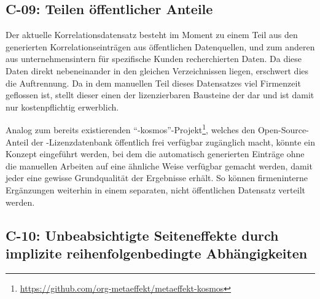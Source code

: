 \subsection{C-09: Teilen öffentlicher Anteile}\label{subsec:c-09-sharing-of-public-data}


Der aktuelle Korrelationsdatensatz besteht im Moment zu einem Teil aus den generierten Korrelationseinträgen aus öffentlichen Datenquellen, und zum anderen aus unternehmensintern für spezifische Kunden recherchierten Daten.
Da diese Daten direkt nebeneinander in den gleichen Verzeichnissen liegen, erschwert dies die Auftrennung.
Da in dem manuellen Teil dieses Datensatzes viel Firmenzeit geflossen ist, stellt dieser einen der lizenzierbaren Bausteine der \metaeffektsp dar und ist damit nur kostenpflichtig erwerblich.

Analog zum bereits existierenden \enquote{\metaeffekt-kosmos}-Projekt\footnote{\url{https://github.com/org-metaeffekt/metaeffekt-kosmos}}, welches den Open-Source-Anteil der \metaeffekt-Lizenzdatenbank öffentlich frei verfügbar zugänglich macht, könnte ein Konzept eingeführt werden, bei dem die automatisch generierten Einträge ohne die manuellen Arbeiten auf eine ähnliche Weise verfügbar gemacht werden, damit jeder eine gewisse Grundqualität der Ergebnisse erhält.
So können firmeninterne Ergänzungen weiterhin in einem separaten, nicht öffentlichen Datensatz verteilt werden.

\subsection{C-10: Unbeabsichtigte Seiteneffekte durch implizite reihenfolgenbedingte Abhängigkeiten}\label{subsec:c-10-order-dependency}


